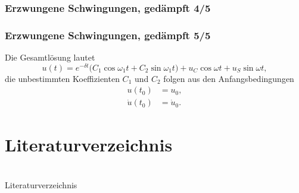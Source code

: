 \documentclass[hyperref={pdfpagemode=FullScreen, colorlinks=false}]{beamer}
\begin{document}
\begin{frame}
\frametitle{Erzwungene Schwingungen, {\normalsize gedämpft 4/5}}




\end{frame}

\begin{frame}
\frametitle{Erzwungene Schwingungen, {\normalsize gedämpft 5/5}}
Die Gesamtlösung lautet
\begin{equation*}
 u(t)=e^{-\delta t}\bigl( C_1\cos\omega_1 t + C_2\sin\omega_1 t \bigr)
 +u_C\cos\omega t + u_S\sin\omega t,
\end{equation*}
die unbestimmten Koeffizienten $C_1$ und $C_2$ folgen aus den Anfangsbedingungen
\begin{align*}
 u(t_0)&=u_0,\\
 \dot{u}(t_0)&=\dot{u}_0.
\end{align*}
\end{frame}


\section{Literaturverzeichnis}

\section{} %
\begin{frame}[allowframebreaks]{Literaturverzeichnis}
	\printbibliography
\end{frame}
\end{document}

